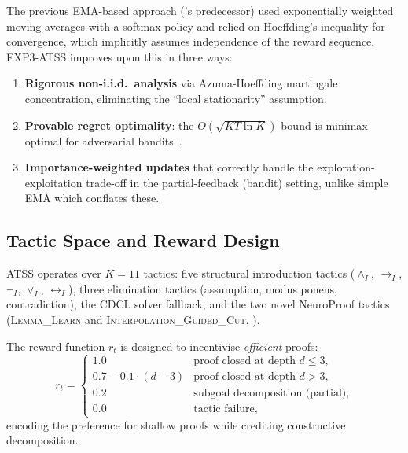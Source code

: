 \documentclass[conference]{IEEEtran}
\newcommand{\ATSS}{\textsc{ATSS}}
\begin{document}
The previous EMA-based approach ('s predecessor)
used exponentially weighted moving averages with a softmax policy and
relied on Hoeffding's inequality for convergence, which implicitly
assumes independence of the reward sequence.  EXP3-ATSS improves upon
this in three ways:
\begin{enumerate}
  \item \textbf{Rigorous non-i.i.d.\ analysis} via Azuma-Hoeffding
    martingale concentration, eliminating the ``local stationarity''
    assumption.
  \item \textbf{Provable regret optimality}: the $O(\sqrt{KT\ln K})$
    bound is minimax-optimal for adversarial bandits~\cite{AuerCesaBianchiFreundSchapire2002}.
  \item \textbf{Importance-weighted updates} that correctly handle
    the exploration-exploitation trade-off in the partial-feedback
    (bandit) setting, unlike simple EMA which conflates these.
\end{enumerate}

\subsection{Tactic Space and Reward Design}

\ATSS{} operates over $K=11$ tactics: five structural introduction
tactics ($\land_I$, $\to_I$, $\neg_I$, $\lor_I$, $\leftrightarrow_I$),
three elimination tactics (assumption, modus ponens, contradiction),
the CDCL solver fallback, and the two novel NeuroProof tactics
(\textsc{Lemma\_Learn} and \textsc{Interpolation\_Guided\_Cut},
).

The reward function $r_t$ is designed to incentivise \emph{efficient}
proofs:
\begin{equation}
  r_t =
  \begin{cases}
    1.0                           & \text{proof closed at depth } d \le 3, \\
    0.7 - 0.1 \cdot (d - 3)      & \text{proof closed at depth } d > 3, \\
    0.2                           & \text{subgoal decomposition (partial)}, \\
    0.0                           & \text{tactic failure},
  \end{cases}
\end{equation}
encoding the preference for shallow proofs while crediting
constructive decomposition.

\end{document}
